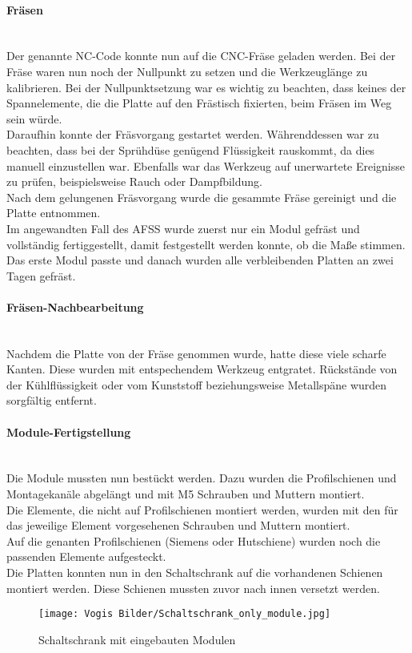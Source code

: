     \paragraph{Fräsen}\mbox{}\\
    Der genannte NC-Code konnte nun auf die CNC-Fräse geladen werden. Bei der Fräse waren nun noch der Nullpunkt zu setzen und die Werkzeuglänge zu kalibrieren. Bei der Nullpunktsetzung war es wichtig zu beachten, dass keines der Spannelemente, die die Platte auf den Frästisch fixierten, beim Fräsen im Weg sein würde.\\
    Daraufhin konnte der Fräsvorgang gestartet werden. Währenddessen war zu beachten, dass bei der Sprühdüse genügend Flüssigkeit rauskommt, da dies manuell einzustellen war. Ebenfalls war das Werkzeug auf unerwartete Ereignisse zu prüfen, beispielsweise Rauch oder Dampfbildung.\\ 
    Nach dem gelungenen Fräsvorgang wurde die gesammte Fräse gereinigt und die Platte entnommen.\\
    Im angewandten Fall des AFSS wurde zuerst nur ein Modul gefräst und vollständig fertiggestellt, damit festgestellt werden konnte, ob die Maße stimmen. Das erste Modul passte und danach wurden alle verbleibenden Platten an zwei Tagen gefräst.

    \paragraph{Fräsen-Nachbearbeitung}\mbox{}\\
    Nachdem die Platte von der Fräse genommen wurde, hatte diese viele scharfe Kanten. Diese wurden mit entspechendem Werkzeug entgratet. Rückstände von der Kühlflüssigkeit oder vom Kunststoff beziehungsweise Metallspäne wurden sorgfältig entfernt.
    \paragraph{Module-Fertigstellung}\mbox{}\\
    Die Module mussten nun bestückt werden. Dazu wurden die Profilschienen und Montagekanäle abgelängt und mit M5 Schrauben und Muttern montiert.\\
    Die Elemente, die nicht auf Profilschienen montiert werden, wurden mit den für das jeweilige Element vorgesehenen Schrauben und Muttern montiert.\\
    Auf die genanten Profilschienen (Siemens oder Hutschiene) wurden noch die passenden Elemente aufgesteckt.\\
    Die Platten konnten nun in den Schaltschrank auf die vorhandenen Schienen montiert werden. Diese Schienen mussten zuvor nach innen versetzt werden. 
    \begin{figure}[h]
        \centering
        \texttt{[image: Vogis Bilder/Schaltschrank\_only\_module.jpg]}
        \caption{Schaltschrank mit eingebauten Modulen}
        \label{fig:Schaltschrank_onlyModule}
    \end{figure}    

